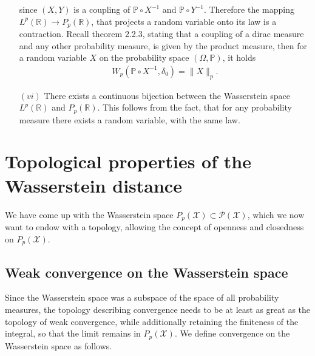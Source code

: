 \documentclass[11pt,a4paper]{article}
\begin{document}
\begin{itemize}
since $(X,Y)$ is a coupling of $\mathbb{P}\circ{}X^{-1}$ and $\mathbb{P}\circ{}Y^{-1}.$
Therefore the mapping $L^p(\mathbb{R})\rightarrow{}P_p(\mathbb{R})$, that projects a random variable onto its law is a contraction. Recall theorem 2.2.3, stating that a coupling of a dirac measure and any other probability measure, is given by the product measure, then for a random variable $X$ on the probability space $(\Omega,\mathbb{P})$, it holds
\begin{align*}
W_p(\mathbb{P}\circ{}X^{-1},\delta_0) = \|X\|_{p}.
\end{align*}
\item[$(vi)$] There exists a continuous bijection between the Wasserstein space $L^p(\mathbb{R})$ and $P_p(\mathbb{R})$. This follows from the fact, that for any probability measure there exists a random variable, with the same law.
\end{itemize}
\section{Topological properties of the Wasserstein distance}
We have come up with the Wasserstein space $P_p(\mathcal{X})\subset\mathcal{P(X)}$, which we now want to endow with a topology, allowing the concept of openness and closedness on $P_p(\mathcal{X})$. 
\subsection{Weak convergence on the Wasserstein space}
Since the Wasserstein space was a subspace of the space of all probability measures, the topology describing convergence needs to be at least as great as the topology of weak convergence, while additionally retaining the finiteness of the integral, so that the limit remains in $P_p(\mathcal{X})$. We define convergence on the Wasserstein space as follows.
\end{document}
